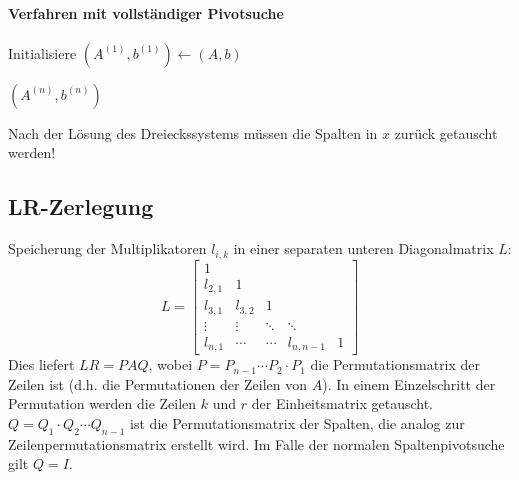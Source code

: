                 \paragraph{Verfahren mit vollständiger Pivotsuche}
	                \begin{algorithm}[H]
	                	Initialisiere \( (A^{(1)}, b^{(1)}) \gets (A, b) \)
	                	
	                	
	                	\Return \( (A^{(n)}, b^{(n)}) \)
	                \end{algorithm}
	                Nach der Lösung des Dreieckssystems müssen die Spalten in \(x\) zurück getauscht werden!

        \subsection{LR-Zerlegung}
            Speicherung der Multiplikatoren \( l_{i,k} \) in einer separaten unteren Diagonalmatrix \(L\):
            \begin{equation*}
	            L =
	            \begin{bmatrix}
	            	1       &         &        &           &  \\
	            	l_{2,1} & 1       &        &           &  \\
	            	l_{3,1} & l_{3,2} & 1      &           &  \\
	            	\vdots  & \vdots  & \ddots & \ddots    &  \\
	            	l_{n,1} & \cdots  & \cdots & l_{n,n-1} & 1
	            \end{bmatrix}
            \end{equation*}
            Dies liefert \( LR = PAQ \), wobei \( P = P_{n-1} \cdots P_2 \cdot P_1 \) die Permutationsmatrix der Zeilen ist (d.h. die Permutationen der Zeilen von \(A\)). In einem Einzelschritt der Permutation werden die Zeilen \(k\) und \(r\) der Einheitsmatrix getauscht. \( Q = Q_1 \cdot Q_2 \cdots Q_{n-1} \) ist die Permutationsmatrix der Spalten, die analog zur Zeilenpermutationsmatrix erstellt wird. Im Falle der normalen Spaltenpivotsuche gilt \( Q = I \).
            
